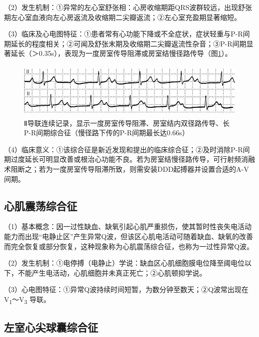 （2）发生机制：①异常的左心室舒张相：心房收缩期距QRS波群较远，出现舒张期左心室血液向左心房返流及收缩期二尖瓣返流；②左心室充盈期显著缩短。

（3）临床及心电图特征：①患者常有心功能下降或不全症状，症状轻重与P-R间期延长的程度相关；②可闻及舒张末期及收缩期二尖瓣返流性杂音；③P-R间期显著延长（＞0.35s），表现为一度房室传导阻滞或房室结慢径路传导（图\ref{fig40-16}）。

\begin{figure}[!htbp]
 \centering
 \includegraphics[width=5.19792in,height=1.05208in]{./images/Image00678.jpg}
 \captionsetup{justification=centering}
 \caption{Ⅱ导联连续记录，显示一度房室传导阻滞、房室结内双径路传导、长P-R间期综合征（慢径路下传的P-R间期最长达0.66s）}
 \label{fig40-16}
  \end{figure} 

（4）临床意义：①该综合征是新近发现和提出的临床综合征；②及时消除P-R间期过度延长可明显改善或根治心功能不良。若为房室结慢径路传导，可行射频消融术阻断之；若为一度房室传导阻滞所致，则需安装DDD起搏器并设置合适的A-V间期。

\protect\hypertarget{text00047.htmlux5cux23subid570}{}{}

\subsection{心肌震荡综合征}

（1）基本概念：因一过性缺血、缺氧引起心肌严重损伤，使其暂时性丧失电活动能力而出现“电静止区”产生异常Q波，但该区心肌电活动可随着缺血、缺氧的改善而完全恢复或部分恢复，这种现象称为心肌震荡综合征，也称为一过性异常Q波。

（2）发生机制：①电停搏（电静止）学说：缺血区心肌细胞膜电位降至阈电位以下，不能产生电活动，心肌细胞并未真正死亡；②心肌顿抑学说。

（3）心电图特征：①异常Q波持续时间短暂，为数分钟至数天；②Q波常出现在V\textsubscript{1}～V\textsubscript{3} 导联。

\protect\hypertarget{text00047.htmlux5cux23subid571}{}{}

\subsection{左室心尖球囊综合征}


